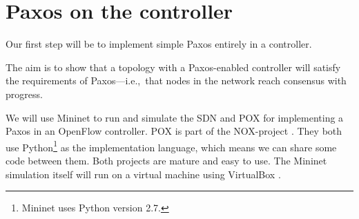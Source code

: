 \section{Paxos on the controller}

Our first step will be to implement simple Paxos \cite{Lam01} entirely in a
controller.

The aim is to show that a topology with a Paxos-enabled controller will
satisfy the requirements of Paxos---i.e.,~that nodes in the network reach
consensus with progress.

We will use Mininet \cite{Lantz:2010:NLR:1868447.1868466} to
run and simulate the \ac{SDN} and POX \cite{POX.1} for
implementing a Paxos in an OpenFlow controller.  POX is part of the
NOX-project \cite{Gude:2008:NTO:1384609.1384625}.  They both use
Python\footnote{Mininet uses Python version 2.7.}
\cite{vanRossum:2009:PRM:1610526} as the implementation language, which
means we can share some code between them.  Both projects are mature and
easy to use.  The Mininet simulation itself will run on a virtual machine
using VirtualBox \cite{Watson:2008:VBB:1344209.1344210}.
